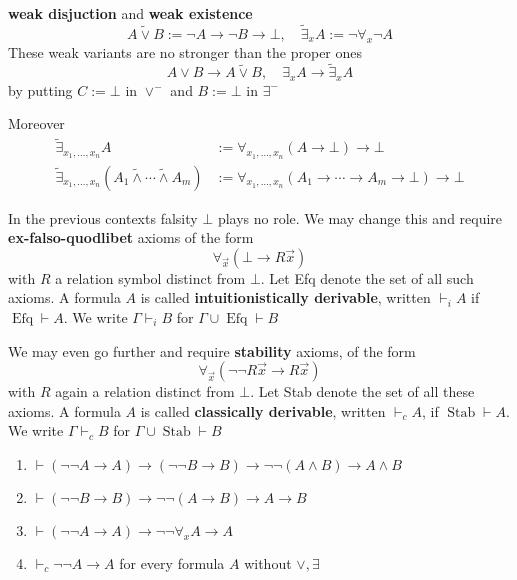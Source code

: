 \documentclass[11pt]{article}
\DeclareMathOperator{\Efq}{Efq}
\DeclareMathOperator{\Stab}{Stab}
\begin{document}
\textbf{weak disjuction} and \textbf{weak existence}
\begin{equation*}
A\tilde{\vee}B:=\neg A\to\neg B\to\bot,\quad
\tilde{\exists}_xA:=\neg\forall_x\neg A
\end{equation*}
These weak variants are no stronger than the proper ones
\begin{equation*}
A\vee B\to A\tilde{\vee}B,\quad\exists_xA\to\tilde{\exists}_xA
\end{equation*}
by putting \(C:=\bot\) in \(\vee^-\) and \(B:=\bot\) in \(\exists^-\)

Moreover
\begin{align*}
\tilde{\exists}_{x_1,\dots,x_n}A&:=\forall_{x_1,\dots,x_n}(A\to\bot)\to\bot\\
\tilde{\exists}_{x_1,\dots,x_n}(A_1\tilde{\wedge}\cdots\tilde{\wedge}A_m)&:=
\forall_{x_1,\dots,x_n}(A_1\to\cdots\to A_m\to\bot)\to\bot
\end{align*}

In the previous contexts falsity \(\bot\) plays no role. We may change this
and require \textbf{ex-falso-quodlibet} axioms of the form
\begin{equation*}
\forall_{\vec{x}}(\bot\to R\vec{x})
\end{equation*}
with \(R\) a relation symbol distinct from \(\bot\). Let Efq denote the set
of all such axioms. A formula \(A\) is called \textbf{intuitionistically derivable},
written \(\vdash_iA\) if \(\Efq\vdash A\). We write \(\Gamma\vdash_i B\) for
\(\Gamma\cup\Efq\vdash B\)

We may even go further and require \textbf{stability} axioms, of the form
\begin{equation*}
\forall_{\vec{x}}(\neg\neg R\vec{x}\to R\vec{x})
\end{equation*}
with \(R\) again a relation distinct from \(\bot\). Let Stab denote the set
of all these axioms. A formula \(A\) is called \textbf{classically derivable}, written
\(\vdash_c A\), if \(\Stab\vdash A\). We write \(\Gamma\vdash_cB\) for
\(\Gamma\cup\Stab\vdash B\)

\begin{theorem}
\begin{enumerate}
\item \(\vdash(\neg\neg A\to A)\to(\neg\neg B\to B)\to\neg\neg(A\wedge B)\to
      A\wedge B\)
\item \(\vdash(\neg\neg B\to B)\to\neg\neg(A\to B)\to A\to B\)
\item \(\vdash(\neg\neg A\to A)\to\neg\neg\forall_xA\to A\)
\item \(\vdash_c\neg\neg A\to A\) for every formula \(A\) without \(\vee,\exists\)
\end{enumerate}
\end{theorem}
\end{document}
